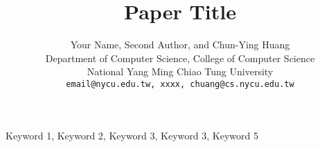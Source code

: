 \documentclass[lettersize,journal]{IEEEtran}
\begin{document}
\title{Paper Title}
\author{
	Your Name, Second Author, and Chun-Ying Huang\\
	Department of Computer Science, College of Computer Science\\
       	National Yang Ming Chiao Tung University\\
    \texttt{email@nycu.edu.tw, xxxx, chuang@cs.nycu.edu.tw}
}

\maketitle

\begin{abstract}

\end{abstract}

\begin{IEEEkeywords}
Keyword 1, Keyword 2, Keyword 3, Keyword 3, Keyword 5
\end{IEEEkeywords}





\end{document}
